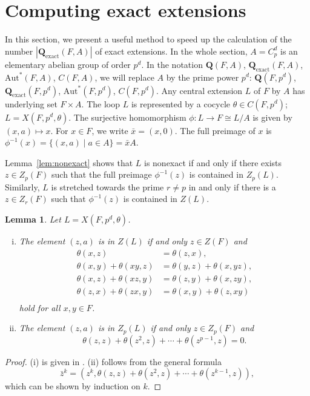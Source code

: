 \documentclass[12pt,a4paper]{amsart}
\newtheorem{lemma}[theorem]{Lemma}
\theoremstyle{definition}
\newcommand{\boldQ}{\mathbf{Q}}
\newcommand{\boldQexact}{\mathbf{Q}_{\mathrm{exact}}}
\begin{document}
\section{Computing exact extensions}\label{sec:exact-extensions}

In this section, we present a useful method to speed up the calculation of the number $|\boldQexact(F, A)|$ of exact extensions. In the whole section, $A=C_p^d$ is an elementary abelian group of order $p^d$. In the notation $\boldQ(F,A)$, $\boldQexact(F,A)$, $\mathrm{Aut}^{\!*}(F,A)$, $C(F,A)$, we will replace $A$ by the prime power $p^d$: $\boldQ(F,p^d)$, $\boldQexact(F,p^d)$, $\mathrm{Aut}^{\!*}(F,p^d)$, $C(F,p^d)$. Any central extension $L$ of $F$ by $A$ has underlying set $F\times A$. The loop $L$ is represented by a cocycle $\theta \in C(F,p^d)$; $L=X(F,p^d,\theta)$. The surjective homomorphism $\phi:L\to F\cong L/A$ is given by $(x,a) \mapsto x$. For $x\in F$, we write $\bar{x}=(x,0)$. The full preimage of $x$ is $\phi^{-1}(x)=\{(x,a) \mid a\in A\}=\bar x A$. 

Lemma~\ref{lem:nonexact} shows that $L$ is nonexact if and only if there exists $z\in Z_{p}(F)$ such that the full preimage $\phi^{-1}(z)$ is contained in $Z_{p}(L)$. Similarly, $L$ is stretched towards the prime $r\neq p$ in and only if there is a $z\in Z_r(F)$ such that $\phi^{-1}(z)$ is contained in $Z(L)$. 

\begin{lemma}
Let $L=X(F,p^d,\theta)$.
\begin{enumerate}[(i)]
\item The element $(z,a)$ is in $Z(L)$ if and only $z\in Z(F)$ and
\begin{equation}\label{eq:theta-central}
\begin{aligned}
 \theta(x,z) &= \theta(z,x),\\
 \theta(x,y) + \theta(xy,z) &= \theta(y,z) + \theta(x,yz),\\
 \theta(x,z) + \theta(xz,y) &= \theta(z,y) + \theta(x,zy),\\
 \theta(z,x) + \theta(zx,y) &= \theta(x,y) + \theta(z,xy)\\
\end{aligned}
\end{equation}
hold for all $x,y\in F$. 
\item The element $(z,a)$ is in $Z_p(L)$ if and only $z\in Z_p(F)$ and
\begin{equation}\label{eq:theta-order-p}
 \theta(z,z) + \theta(z^{2},z) + \cdots + \theta(z^{p-1},z) = 0.
\end{equation}
\end{enumerate}
\end{lemma}
\begin{proof}
(i) is given in \cite[Section 8]{DalyVojtechovsky2009}. (ii) follows from the general formula
\[
\bar z^k=(z^k, \theta(z,z)+\theta(z^2,z)+\cdots+\theta(z^{k-1},z)),
\]
which can be shown by induction on $k$. 
\end{proof}
\end{document}
